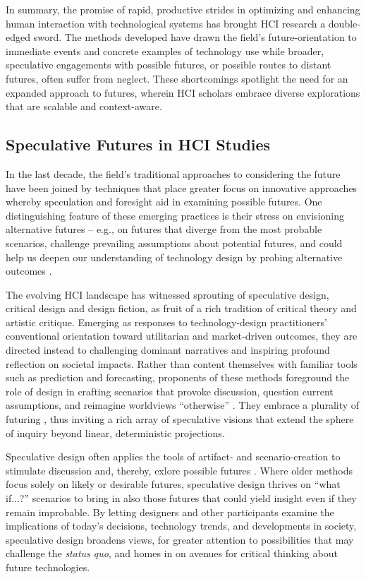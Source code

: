 In summary, the promise of rapid, productive strides in optimizing and enhancing human interaction with technological systems has brought HCI research a double-edged sword. The methods developed have drawn the field's future-orientation to immediate events and concrete examples of technology use while broader, speculative engagements with possible futures, or possible routes to distant futures, often suffer from neglect. These shortcomings spotlight the need for an expanded approach to futures, wherein HCI scholars embrace diverse explorations that are scalable and context-aware.


\subsection{Speculative Futures in HCI Studies} \label{sec:speculative-futures-HCI} 
In the last decade, the field's traditional approaches to considering the future have been joined by techniques that place greater focus on innovative approaches whereby speculation and foresight aid in examining possible futures. One distinguishing feature of these emerging practices is their stress on envisioning alternative futures -- e.g., on futures that diverge from the most probable scenarios, challenge prevailing assumptions about potential futures, and could help us deepen our understanding of technology design by probing alternative outcomes \cite{kozubaev_expanding_2020}.  

The evolving HCI landscape has witnessed sprouting of speculative design, 
critical design 
and design fiction, 
as fruit of a rich tradition of critical theory and artistic critique. Emerging as responses to technology-design practitioners' conventional orientation toward utilitarian and market-driven outcomes, they are directed instead to challenging dominant narratives and inspiring profound reflection on societal impacts. Rather than content themselves with familiar tools such as prediction and forecasting, proponents of these methods foreground the role of design in crafting scenarios that provoke discussion, question current assumptions, and reimagine worldviews ``otherwise'' \cite{blythe_research_2014}. They embrace a plurality of futuring \cite{howell2021calling}, thus inviting a rich array of speculative visions that extend the sphere of inquiry beyond linear, deterministic projections.

Speculative design often applies the tools of artifact- and scenario-creation to stimulate discussion and, thereby, exlore possible futures \cite{wong2018speculative, dunneSpeculativeEverythingDesign2013a}. Where older methods focus solely on likely or desirable futures, speculative design thrives on ``what if...?'' scenarios to bring in also those futures that could yield insight even if they remain improbable. By letting designers and other participants examine the implications of today's decisions, technology trends, and developments in society, speculative design broadens views, for greater attention to possibilities that may challenge the \emph{status quo}, and homes in on avenues for critical thinking about future technologies.

